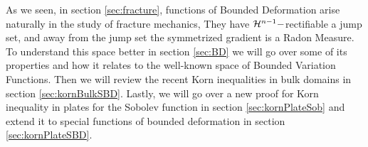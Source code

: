 \begin{comment}
    Introduction sentences:
\begin{enumerate}

\item The first two authors, together with G. Francfort established in [12] a Poincaré–Korn’s inequality for
functions with p-integrable strain and a small jump set. Their idea is to estimate the symmetric variation of
u on many lines having different orientations and not intersecting the jump set, thus allowing to use of the
fundamental theorem of calculus along such lines
\item On the one hand, the drawback of [12] is the lack of control on the perimeter of the exceptional set, which
prevents good estimates for the strain; nevertheless, these can be recovered through suitable mollification.
\item Functions in SBDp arise naturally in the study of geometrically linear fracture models. They have a jump set of finite (n-1)-dimensional measure and, away from the jump set, a symmetrized gradient


\item  The key idea of the proof is to use the fundamental theorem of calculus
along lines that do not intersect the jump set to estimate the variation of
u. This would be immediate in the BV setting, in which one fully controls
the gradient. This would be immediate in the BV setting, in which one fully controls
the gradient. In a BD setting one only obtains control of the longitudinal
component of u. Therefore one needs to consider lines with many different
orientations, making sure to choose them so that they do not intersect the
jump set,

\end{enumerate}
\end{comment}

As we seen, in section \ref{sec:fracture}, functions of Bounded Deformation arise naturally in the study of fracture mechanics, They have ${\mathcal H}^{n-1}-$rectifiable a jump set, and away from the jump set the symmetrized gradient is a Radon Measure. To understand this space better in section \ref{sec:BD} we will go over some of its properties and how it relates to the well-known space of Bounded Variation Functions. Then we will review the recent Korn inequalities in bulk domains in section \ref{sec:kornBulkSBD}. Lastly, we will go over a new proof for Korn inequality in plates for the Sobolev function in section \ref{sec:kornPlateSob} and extend it to special functions of bounded deformation in section \ref{sec:kornPlateSBD}. 

